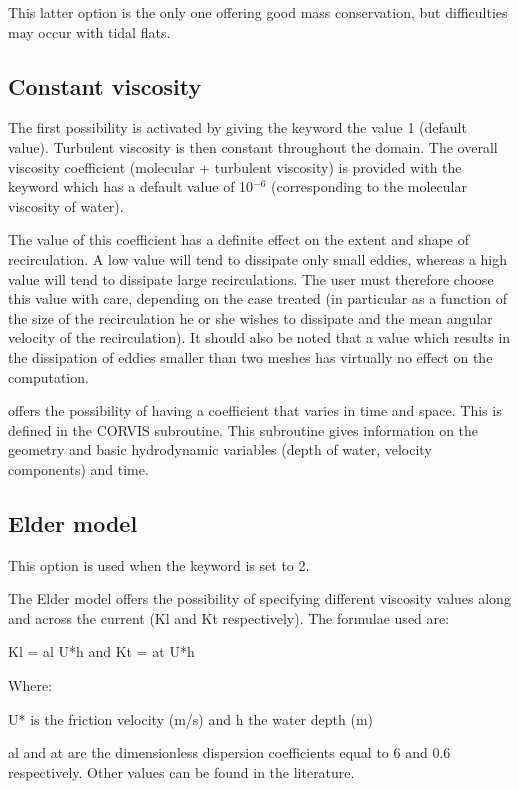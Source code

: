  This latter option is the only one offering good mass conservation, but difficulties may occur with tidal flats.


\subsection{ Constant viscosity}

 The first possibility is activated by giving the keyword   the value 1 (default value). Turbulent viscosity is then constant throughout the domain. The overall viscosity coefficient (molecular + turbulent viscosity) is provided with the keyword which has a default value of 10${}^{-6}$ (corresponding to the molecular viscosity of water).

 The value of this coefficient has a definite effect on the extent and shape of recirculation. A low value will tend to dissipate only small eddies, whereas a high value will tend to dissipate large recirculations. The user must therefore choose this value with care, depending on the case treated (in particular as a function of the size of the recirculation he or she wishes to dissipate and the mean angular velocity of the recirculation). It should also be noted that a value which results in the dissipation of eddies smaller than two meshes has virtually no effect on the computation.

  offers the possibility of having a coefficient that varies in time and space. This is defined in the CORVIS subroutine. This subroutine gives information on the geometry and basic hydrodynamic variables (depth of water, velocity components) and time.


\subsection{ Elder model}

 This option is used when the keyword  is set to 2.

 The Elder model offers the possibility of specifying different viscosity values along and across the current (Kl and Kt respectively). The formulae used are:

  Kl = al U*h and  Kt = at U*h

 Where:

 U* is the friction velocity (m/s) and h the water depth (m)

 al and at are the dimensionless dispersion coefficients equal to 6 and 0.6 respectively. Other values can be found in the literature.

